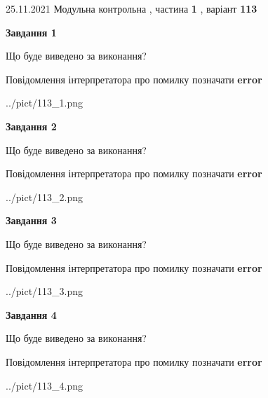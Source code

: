 \documentclass[10pt, ukrainian]{article}
\begin{document}
{25.11.2021 Модульна контрольна , частина \textbf { 1 }, варіант  \No \textbf { 113 }\par}
{
\begin {large}

{\begin {center}\textbf{Завдання 1}\end {center}}\par
Що буде виведено за виконання? \par
Повідомлення інтерпретатора про помилку позначати \textbf{error}

\begin{center}
	{../pict/113_1.png}
\end{center}
\newpage

{\begin {center}\textbf{Завдання 2}\end {center}}\par
Що буде виведено за виконання? \par
Повідомлення інтерпретатора про помилку позначати \textbf{error}

\begin{center}
	{../pict/113_2.png}
\end{center}
\newpage

{\begin {center}\textbf{Завдання 3}\end {center}}\par
Що буде виведено за виконання? \par
Повідомлення інтерпретатора про помилку позначати \textbf{error}

\begin{center}
	{../pict/113_3.png}
\end{center}
\newpage

{\begin {center}\textbf{Завдання 4}\end {center}}\par
Що буде виведено за виконання? \par
Повідомлення інтерпретатора про помилку позначати \textbf{error}

\begin{center}
	{../pict/113_4.png}
\end{center}
\newpage


\end{large}}
\end{document}
